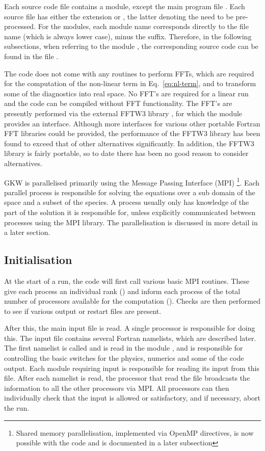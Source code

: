Each source code file contains a module, except the main program file .
Each source file has either the extension  or , the latter denoting the need to be pre-processed.
For the modules, each module name corresponds directly to the file name (which is always lower case), minus the suffix.
Therefore, in the following subsections, when referring to the module , the corresponding source code can be found
in the file .

The code does not come with any routines to perform FFTs, which are required for the computation of the non-linear term in Eq.~\ref{eq:nl-term}, and to transform some of the diagnostics into real space. No FFT's are required for a linear run and the code can be compiled without FFT functionality. The FFT's are presently performed via the external FFTW3 library \cite{FFT05}, for which the
 module provides an interface. Although more interfaces for various other portable Fortran FFT libraries could be
provided, the performance of the FFTW3 library has been found to exceed that of other alternatives significantly. In addition,
the FFTW3 library is fairly portable, so to date there has been no good reason to consider alternatives.

GKW is parallelised primarily using the Message Passing Interface (MPI)
\footnote{Shared memory parallelisation, implemented via OpenMP directives, is
now possible with the code and is documented in a later subsection}. Each
parallel process is responsible for solving the equations over a sub domain of
the space and a subset of the species. A process usually only has knowledge of
the part of the solution it is responsible for, unless explicitly communicated
between processes using the MPI library. The parallelisation is discussed in
more detail in a later section.

\subsection{Initialisation}

At the start of a run, the code will first call various basic MPI routines.
These give each process an individual rank () and inform
each process of the total number of processors available for the computation
(). Checks are then performed to see if various
output or restart files are present. 

After this, the main input file is read. A single processor
is responsible for doing this. The input file contains several Fortran namelists, which
are described later. The first namelist is called  and is read in the module
, and is responsible for controlling the basic switches for the physics, numerics and
some of the code output. Each module requiring input is responsible for reading its input
from this file. After each namelist is read, the processor that read the file broadcasts
the information to all the other processors via MPI. All processors can then individually
check that the input is allowed or satisfactory, and if necessary, abort the run.


